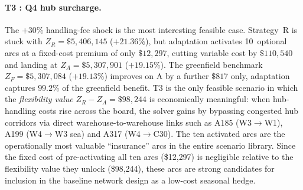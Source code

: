 \paragraph{T3 : Q4 hub surcharge.}
The $+30\%$ handling-fee shock is the most interesting feasible
case. Strategy~R is stuck with $Z_R = \$5{,}406{,}145$ ($+21.36\%$),
but adaptation activates 10~optional arcs at a fixed-cost premium of
only $\$12{,}297$, cutting variable cost by $\$110{,}540$ and
landing at $Z_A = \$5{,}307{,}901$ ($+19.15\%$). The greenfield
benchmark $Z_F = \$5{,}307{,}084$ ($+19.13\%$) improves on A by a
further $\$817$ only, adaptation captures $99.2\%$ of the
greenfield benefit. T3 is the only feasible scenario in which the
\emph{flexibility value} $Z_R - Z_A = \$98{,}244$ is economically
meaningful: when hub-handling costs rise across the board, the
solver gains by bypassing congested hub corridors via
direct warehouse-to-warehouse links such as A185 (W3$\rightarrow$W1),
A199 (W4$\rightarrow$W3 sea) and A317 (W4$\rightarrow$C30). The
ten activated arcs are the operationally most valuable
``insurance'' arcs in the entire scenario library. Since the fixed cost of pre-activating all ten arcs (\$12{,}297) 
is negligible relative to the flexibility value they unlock 
(\$98{,}244), these arcs are strong candidates for inclusion in 
the baseline network design as a low-cost seasonal hedge.
\begin{table}[H]
\centering
\caption{Cost decomposition --- scenario T3 (\$).}
\label{tab:cost_decomp_t3}
\end{table}
